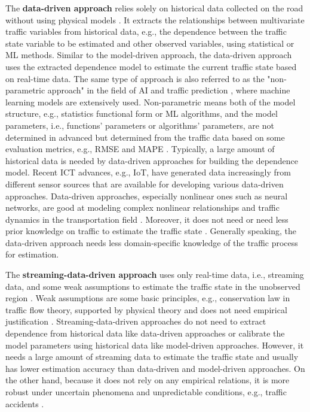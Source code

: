 \documentclass[english]{kththesis}
\begin{document}
The \textbf{data-driven approach} relies solely on historical data collected on the road without using physical models \cite{seo_tse}. It extracts the relationships between multivariate traffic variables from historical data, e.g., the dependence between the traffic state variable to be estimated and other observed variables, using statistical or ML methods. Similar to the model-driven approach, the data-driven approach uses the extracted dependence model to estimate the current traffic state based on real-time data. The same type of approach is also referred to as the "non-parametric approach" in the field of AI and traffic prediction \cite{van_traffic_prediction_models}, where machine learning models are extensively used. Non-parametric means both of the model structure, e.g., statistics functional form or ML algorithms, and the model parameters, i.e., functions' parameters or algorithms' parameters, are not determined in advanced but determined from the traffic data based on some evaluation metrics, e.g., RMSE and MAPE \cite{van_traffic_prediction_models}. Typically, a large amount of historical data is needed by data-driven approaches for building the dependence model. Recent ICT advances, e.g., IoT, have generated data increasingly from different sensor sources that are available for developing various data-driven approaches. Data-driven approaches, especially nonlinear ones such as neural networks, are good at modeling complex nonlinear relationships and traffic dynamics in the transportation field \cite{seo_tse, vlahogianni_forecast_overview, van_traffic_prediction_models}. Moreover, it does not need or need less prior knowledge on traffic to estimate the traffic state \cite{tsanakas_emission_estimation}. Generally speaking, the data-driven approach needs less domain-specific knowledge of the traffic process for estimation.

The \textbf{streaming-data-driven approach} uses only real-time data, i.e., streaming data, and some weak assumptions to estimate the traffic state in the unobserved region \cite{seo_tse}. Weak assumptions are some basic principles, e.g., conservation law in traffic flow theory, supported by physical theory and does not need empirical justification \cite{seo_tse}. Streaming-data-driven approaches do not need to extract dependence from historical data like data-driven approaches or calibrate the model parameters using historical data like model-driven approaches. However, it needs a large amount of streaming data to estimate the traffic state and usually has lower estimation accuracy than data-driven and model-driven approaches. On the other hand, because it does not rely on any empirical relations, it is more robust under uncertain phenomena and unpredictable conditions, e.g., traffic accidents \cite{seo_tse}.
\end{document}
